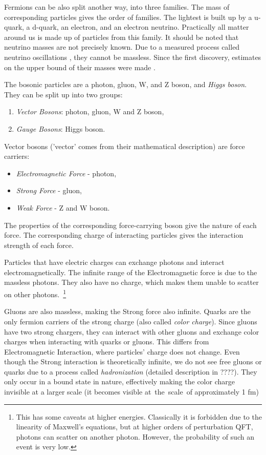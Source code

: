 Fermions can be also split another way, into three families. 
The mass of corresponding particles gives the order of families.
The lightest is built up by a u-quark, a d-quark, an electron, and an electron neutrino.
Practically all matter around us is made up of particles from this family.
It should be noted that neutrino masses are not precisely known.
Due to a measured process \cite{sadbury} called neutrino oscillations \cite{pdg}, they cannot be massless.
Since the first discovery, estimates on the upper bound of their masses were made \cite{pdg}.

The bosonic particles are a photon, gluon, W, and Z boson, and \emph{Higgs boson}. They can be split up into two groups:
\begin{enumerate}
    \item \emph{Vector Bosons}: photon, gluon, W and Z boson,
    \item \emph{Gauge Bosons}: Higgs boson.
\end{enumerate}
Vector bosons ('vector' comes from their mathematical description) are force carriers:
\begin{itemize}
    \item \emph{Electromagnetic Force} - photon,
    \item \emph{Strong Force} - gluon,
    \item \emph{Weak Force} - Z and W boson.
\end{itemize}
The properties of the corresponding force-carrying boson give the nature of each force.
The corresponding charge of interacting particles gives the interaction strength of each force.

Particles that have electric charges can exchange photons and interact electromagnetically.
The infinite range of the Electromagnetic force is due to the massless photons.
They also have no charge, which makes them unable to scatter on other photons.~\footnote{This has some caveats at higher energies. Classically it is forbidden due to the linearity of Maxwell's equations, but at higher orders of perturbation QFT, photons can scatter on another photon. However, the probability of such an event is very low.}

Gluons are also massless, making the Strong force also infinite.
Quarks are the only fermion carriers of the strong charge (also called \emph{color charge}). 
Since gluons have two strong chargers, they can interact with other gluons and exchange color charges when interacting with quarks or gluons.
This differs from Electromagnetic Interaction, where particles' charge does not change. 
Even though the Strong interaction is theoretically infinite, we do not see free gluons or quarks due to a process called \emph{hadronization} (detailed description in ????). 
They only occur in a bound state in nature, effectively making the color charge invisible at a larger scale (it becomes visible at~the~scale~of approximately 1 fm)

